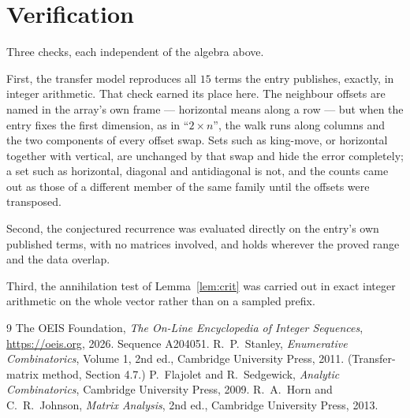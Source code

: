 \documentclass[11pt,a4paper]{article}
\theoremstyle{plain}
\theoremstyle{definition}
\begin{document}
\section{Verification}

Three checks, each independent of the algebra above.

First, the transfer model reproduces all $15$ terms the entry publishes, exactly, in
integer arithmetic. That check earned its place here. The neighbour offsets are named in the
array's own frame --- horizontal means along a row --- but when the entry fixes the first
dimension, as in ``$2\times n$'', the walk runs along columns and the two components of every
offset swap. Sets such as king-move, or horizontal together with vertical, are unchanged by
that swap and hide the error completely; a set such as horizontal, diagonal and antidiagonal
is not, and the counts came out as those of a different member of the same family until the
offsets were transposed.

Second, the conjectured recurrence was evaluated directly on the entry's own published terms,
with no matrices involved, and holds wherever the proved range and the data overlap.

Third, the annihilation test of Lemma~\ref{lem:crit} was carried out in exact integer
arithmetic on the whole vector rather than on a sampled prefix.

\begin{thebibliography}{9}
 The OEIS Foundation, \emph{The On-Line Encyclopedia of Integer
Sequences}, \url{https://oeis.org}, 2026. Sequence A204051.
 R.~P.~Stanley, \emph{Enumerative Combinatorics}, Volume 1, 2nd ed.,
Cambridge University Press, 2011. (Transfer-matrix method, Section 4.7.)
 P.~Flajolet and R.~Sedgewick, \emph{Analytic Combinatorics}, Cambridge
University Press, 2009.
 R.~A.~Horn and C.~R.~Johnson, \emph{Matrix Analysis}, 2nd ed., Cambridge
University Press, 2013.
\end{thebibliography}
\end{document}
